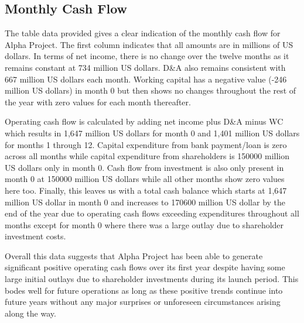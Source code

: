 

\subsection{Monthly Cash Flow}\label{sec:monthly-cash-flow}

The table data provided gives a clear indication of the monthly cash flow for Alpha Project. The first column indicates that all amounts are in millions of US dollars. In terms of net income, there is no change over the twelve months as it remains constant at 734 million US dollars. D\&A also remains consistent with 667 million US dollars each month. Working capital has a negative value (-246 million US dollars) in month 0 but then shows no changes throughout the rest of the year with zero values for each month thereafter. 

Operating cash flow is calculated by adding net income plus D\&A minus WC which results in 1,647 million US dollars for month 0 and 1,401 million US dollars for months 1 through 12. Capital expenditure from bank payment/loan is zero across all months while capital expenditure from shareholders is 150000 million US dollars only in month 0. Cash flow from investment is also only present in month 0 at 150000 million US dollars while all other months show zero values here too. Finally, this leaves us with a total cash balance which starts at 1,647 million US dollar in month 0 and increases to 170600 million US dollar by the end of the year due to operating cash flows exceeding expenditures throughout all months except for month 0 where there was a large outlay due to shareholder investment costs. 

Overall this data suggests that Alpha Project has been able to generate significant positive operating cash flows over its first year despite having some large initial outlays due to shareholder investments during its launch period. This bodes well for future operations as long as these positive trends continue into future years without any major surprises or unforeseen circumstances arising along the way.